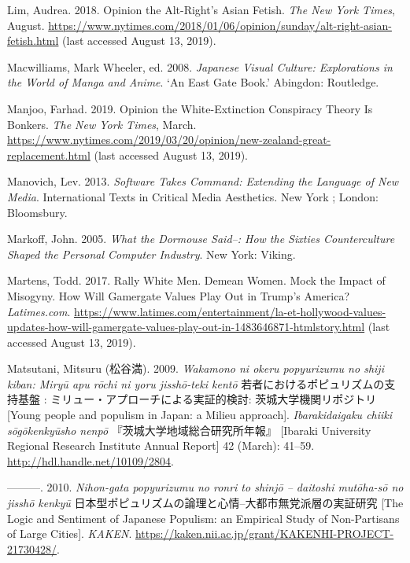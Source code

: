 \documentclass[10pt,british,A4paper,oneside]{memoir}
\begin{document}
\hypertarget{ref-lim_opinion_2018}{}
Lim, Audrea. 2018. Opinion the Alt-Right's Asian Fetish. \emph{The New
York Times}, August.
\url{https://www.nytimes.com/2018/01/06/opinion/sunday/alt-right-asian-fetish.html} (last accessed August 13, 2019).

\hypertarget{ref-macwilliams_japanese_2008}{}
Macwilliams, Mark Wheeler, ed. 2008. \emph{Japanese Visual Culture:
Explorations in the World of Manga and Anime}. `An East Gate Book.'
Abingdon: Routledge.

\hypertarget{ref-manjoo_opinion_2019}{}
Manjoo, Farhad. 2019. Opinion the White-Extinction Conspiracy Theory Is
Bonkers. \emph{The New York Times}, March.
\url{https://www.nytimes.com/2019/03/20/opinion/new-zealand-great-replacement.html} (last accessed August 13, 2019).

\hypertarget{ref-manovich_software_2013}{}
Manovich, Lev. 2013. \emph{Software Takes Command: Extending the
Language of New Media}. International Texts in Critical Media
Aesthetics. New York ; London: Bloomsbury.

\hypertarget{ref-markoff_what_2005}{}
Markoff, John. 2005. \emph{What the Dormouse Said--: How the Sixties
Counterculture Shaped the Personal Computer Industry}. New York: Viking.

\hypertarget{ref-martens_rally_2017}{}
Martens, Todd. 2017. Rally White Men. Demean Women. Mock the Impact of
Misogyny. How Will Gamergate Values Play Out in Trump's America?
\emph{Latimes.com}.
\url{https://www.latimes.com/entertainment/la-et-hollywood-values-updates-how-will-gamergate-values-play-out-in-1483646871-htmlstory.html} (last accessed August 13, 2019).

\hypertarget{ref-matsutani__2009}{}
Matsutani, Mitsuru (松谷満). 2009. \emph{Wakamono ni okeru popyurizumu no shiji kiban: Miryū apu rōchi ni yoru jisshō-teki kentō} 若者におけるポピュリズムの支持基盤 : ミリュー・アプローチによる実証的検討: 茨城大学機関リポジトリ [Young people and populism in Japan: a Milieu approach].
\emph{Ibarakidaigaku chiiki sōgōkenkyūsho nenpō
} 『茨城大学地域総合研究所年報』 [Ibaraki University Regional Research Institute Annual Report] 42 (March): 41--59.
\url{http://hdl.handle.net/10109/2804}.

\hypertarget{ref-matsutani_eng:_2010}{}
---------. 2010. \emph{Nihon-gata popyurizumu no ronri to shinjō -- daitoshi mutōha-sō no jisshō kenkyū} 日本型ポピュリズムの論理と心情--大都市無党派層の実証研究 [The Logic and Sentiment of Japanese Populism: an Empirical Study of Non-Partisans of Large Cities]. \emph{KAKEN}.
\url{https://kaken.nii.ac.jp/grant/KAKENHI-PROJECT-21730428/}.
\end{document}
